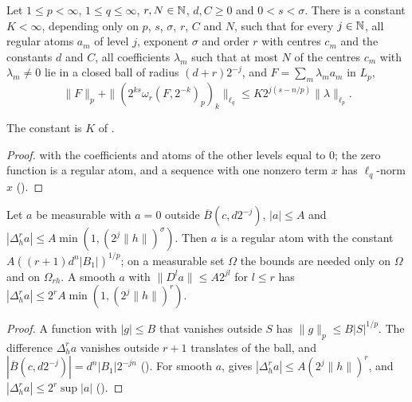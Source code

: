 \begin{lemma}
\label{lem:single-level}
\leanok
{}
Let $1 \leq p < \infty$, $1 \leq q \leq \infty$, $r, N \in \mathbb{N}$, $d, C \geq 0$ and
$0 < s < \sigma$. There is a constant $K < \infty$, depending only on $p$, $s$, $\sigma$, $r$, $C$
and $N$, such that for every $j \in \mathbb{N}$, all regular atoms $a_m$ of level $j$, exponent $\sigma$
and order $r$ with centres $c_m$ and the constants $d$ and $C$, all coefficients $\lambda_m$ such
that at most $N$ of the centres $c_m$ with $\lambda_m \neq 0$ lie in a closed ball of radius
$(d + r) 2^{-j}$, and $F = \sum_m \lambda_m a_m$ in $L_p$,
\[
  \|F\|_p + \|(2^{ks} \omega_r(F, 2^{-k})_p)_k\|_{\ell_q}
  \leq K 2^{j(s - n/p)} \|\lambda\|_{\ell_p} .
\]
\end{lemma}

The constant is $K$ of .

\begin{proof}
\leanok
{} with the coefficients and atoms of the other levels equal to $0$; the
zero function is a regular atom, and a sequence with one nonzero term $x$ has $\ell_q$-norm $x$
().
\end{proof}

\begin{lemma}
\label{lem:pointwise-atoms}
\leanok
{}
Let $a$ be measurable with $a = 0$ outside $\overline{B}(c, d 2^{-j})$, $|a| \leq A$ and
$|\Delta_h^r a| \leq A \min(1, (2^j \|h\|)^\sigma)$. Then $a$ is a regular atom with the constant
$A ((r + 1) d^n |B_1|)^{1/p}$; on a measurable set $\Omega$ the bounds are needed only on $\Omega$
and on $\Omega_{rh}$. A smooth $a$ with $\|D^l a\| \leq A 2^{jl}$ for $l \leq r$ has
$|\Delta_h^r a| \leq 2^r A \min(1, (2^j \|h\|)^r)$.
\end{lemma}

\begin{proof}
\leanok
{}
A function with $|g| \leq B$ that vanishes outside $S$ has $\|g\|_p \leq B |S|^{1/p}$. The
difference $\Delta_h^r a$ vanishes outside $r + 1$ translates of the ball, and
$|\overline{B}(c, d 2^{-j})| = d^n |B_1| 2^{-jn}$ (). For smooth $a$,
 gives $|\Delta_h^r a| \leq A (2^j \|h\|)^r$, and
$|\Delta_h^r a| \leq 2^r \sup |a|$ ().
\end{proof}

